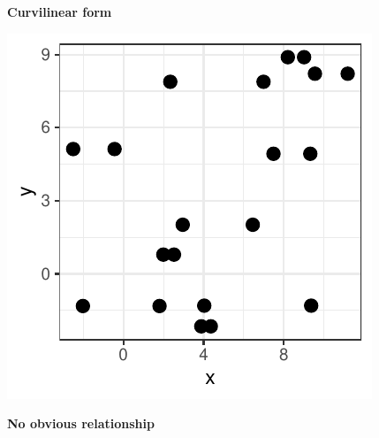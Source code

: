 \begin{minipage}{1.2\textwidth}
\begin{minipage}[t]{0.3\textwidth}
\begin{figure}[H]
\begin{center}
          \textbf{Curvilinear form}
        \end{center}
      \end{figure}
    \end{minipage}
    \begin{minipage}[t]{0.3\textwidth}
      \begin{figure}[H]
        \begin{center}
          \includegraphics[scale=0.4]{figure-latex/unnamed-chunk-4-6-1}
          
          \textbf{No obvious relationship}
        \end{center}
      \end{figure}
    \end{minipage}
\end{minipage}

